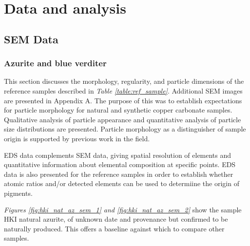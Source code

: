 \chapter{Data and analysis}

\ifpdf
    \graphicspath{{Chapter3/Figs/Raster/}{Chapter3/Figs/PDF/}{Chapter3/Figs/}}
\else
    \graphicspath{{Chapter3/Figs/Vector/}{Chapter3/Figs/}}
\fi

\section[SEM Data]{SEM Data}
\label{section3.1}

\subsection[Azurite and blue verditer]{Azurite and blue verditer}
\label{subsection3.1.1}

This section discusses the morphology, regularity, and particle dimensions of the reference samples described in \textit{Table \ref{table:ref_sample}}. Additional SEM images are presented in Appendix A. The purpose of this was to establish expectations for particle morphology for natural and synthetic copper carbonate samples. Qualitative analysis of particle appearance and quantitative analysis of particle size distributions are presented. Particle morphology as a distinguisher of sample origin is supported by previous work in the field.~\autocite{MacTaggart,Naumova1994,Naumova1990,Keith2003}

EDS data complements SEM data, giving spatial resolution of elements and quantitative information about elemental composition at specific points. EDS data is also presented for the reference samples in order to establish whether atomic ratios and/or detected elements can be used to determiine the origin of pigments.



\textit{Figures \ref{fig:hki_nat_az_sem_1} and \ref{fig:hki_nat_az_sem_2}} show the sample HKI natural azurite, of unknown date and provenance but confirmed to be naturally produced. This offers a baseline against which to compare other samples. 

